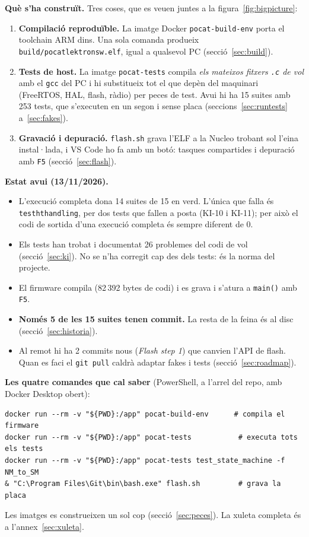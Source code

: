 \documentclass[11pt,a4paper]{article}
\DeclareRobustCommand{\_}{\textunderscore\allowbreak}
\newcommand{\cd}[1]{\texttt{#1}}
\begin{document}
\textbf{Què s'ha construït.} Tres coses, que es veuen juntes a la figura~\ref{fig:bigpicture}:
\begin{enumerate}
\item \textbf{Compilació reproduïble.} La imatge Docker \cd{pocat-build-env} porta el
  toolchain ARM dins. Una sola comanda produeix \cd{build/pocat\_lektron\_sw.elf}, igual a
  qualsevol PC (secció~\ref{sec:build}).
\item \textbf{Tests de host.} La imatge \cd{pocat-tests} compila \emph{els mateixos fitxers
  \cd{.c} de vol} amb el \cd{gcc} del PC i hi substitueix tot el que depèn del maquinari
  (FreeRTOS, HAL, flash, ràdio) per peces de test. Avui hi ha 15 suites amb 253 tests,
  que s'executen en un segon i sense placa (seccions~\ref{sec:runtests} a~\ref{sec:fakes}).
\item \textbf{Gravació i depuració.} \cd{flash.sh} grava l'ELF a la Nucleo trobant sol
  l'eina instal·lada, i VS Code ho fa amb un botó: tasques compartides i depuració amb
  \cd{F5} (secció~\ref{sec:flash}).
\end{enumerate}

\textbf{Estat avui (13/11/2026).}
\begin{itemize}
\item L'execució completa dona 14 suites de 15 en verd. L'única que falla és
  \cd{test\_ht\_handling}, per dos tests que fallen a posta (KI-10 i KI-11); per això el
  codi de sortida d'una execució completa és sempre diferent de 0.
\item Els tests han trobat i documentat 26 problemes del codi de vol (secció~\ref{sec:ki}).
  No se n'ha corregit cap des dels tests: és la norma del projecte.
\item El firmware compila (82\,392 bytes de codi) i es grava i s'atura a \cd{main()} amb \cd{F5}.
\item \textbf{Només 5 de les 15 suites tenen commit.} La resta de la feina és al disc
  (secció~\ref{sec:historia}).
\item Al remot hi ha 2 commits nous (\emph{Flash step 1}) que canvien l'API de flash. Quan
  es faci el \cd{git pull} caldrà adaptar fakes i tests (secció~\ref{sec:roadmap}).
\end{itemize}

\textbf{Les quatre comandes que cal saber} (PowerShell, a l'arrel del repo, amb Docker Desktop obert):
\begin{lstlisting}
docker run --rm -v "${PWD}:/app" pocat-build-env      # compila el firmware
docker run --rm -v "${PWD}:/app" pocat-tests           # executa tots els tests
docker run --rm -v "${PWD}:/app" pocat-tests test_state_machine -f NM_to_SM
& "C:\Program Files\Git\bin\bash.exe" flash.sh         # grava la placa
\end{lstlisting}
Les imatges es construeixen un sol cop (secció~\ref{sec:peces}). La xuleta completa és a
l'annex~\ref{sec:xuleta}.
\end{document}
